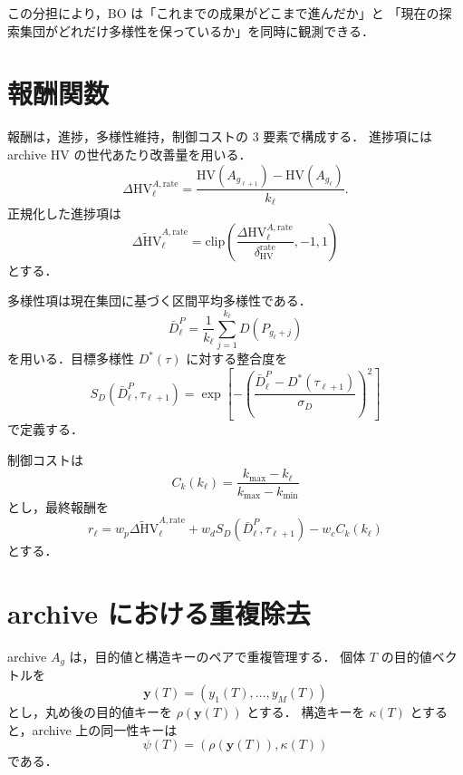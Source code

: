 \documentclass[a4paper,11pt]{ltjsarticle}
\newcommand{\clip}{\mathrm{clip}}
\newcommand{\HV}{\mathrm{HV}}
\begin{document}
この分担により，BO は「これまでの成果がどこまで進んだか」と
「現在の探索集団がどれだけ多様性を保っているか」を同時に観測できる．

\section{報酬関数}

報酬は，進捗，多様性維持，制御コストの 3 要素で構成する．
進捗項には archive HV の世代あたり改善量を用いる．
\begin{equation}
\Delta \HV^{A,\mathrm{rate}}_\ell
=
\frac{
\HV(A_{g_{\ell+1}})-\HV(A_{g_\ell})
}
{k_\ell}.
\end{equation}
正規化した進捗項は
\begin{equation}
\widetilde{\Delta \HV}^{A,\mathrm{rate}}_\ell
=
\clip
\left(
\frac{\Delta \HV^{A,\mathrm{rate}}_\ell}{\delta_{\HV}^{\mathrm{rate}}},
-1,1
\right)
\end{equation}
とする．

多様性項は現在集団に基づく区間平均多様性である．
\begin{equation}
\bar{D}^{P}_\ell
=
\frac{1}{k_\ell}
\sum_{j=1}^{k_\ell}
D(P_{g_\ell+j})
\end{equation}
を用いる．目標多様性 \(D^\ast(\tau)\) に対する整合度を
\begin{equation}
S_D(\bar{D}^{P}_\ell,\tau_{\ell+1})
=
\exp
\left[
-
\left(
\frac{\bar{D}^{P}_\ell-D^\ast(\tau_{\ell+1})}{\sigma_D}
\right)^2
\right]
\end{equation}
で定義する．

制御コストは
\begin{equation}
C_k(k_\ell)
=
\frac{k_{\max}-k_\ell}{k_{\max}-k_{\min}}
\end{equation}
とし，最終報酬を
\begin{equation}
r_\ell
=
w_p
\widetilde{\Delta \HV}^{A,\mathrm{rate}}_\ell
+
w_d
S_D(\bar{D}^{P}_\ell,\tau_{\ell+1})
-
w_c
C_k(k_\ell)
\end{equation}
とする．

\section{archive における重複除去}

archive \(A_g\) は，目的値と構造キーのペアで重複管理する．
個体 \(T\) の目的値ベクトルを
\begin{equation}
\bm{y}(T)=(y_1(T),\dots,y_M(T))
\end{equation}
とし，丸め後の目的値キーを \(\rho(\bm{y}(T))\) とする．
構造キーを \(\kappa(T)\) とすると，archive 上の同一性キーは
\begin{equation}
\psi(T)
=
\left(
\rho(\bm{y}(T)),
\kappa(T)
\right)
\end{equation}
である．
\end{document}

